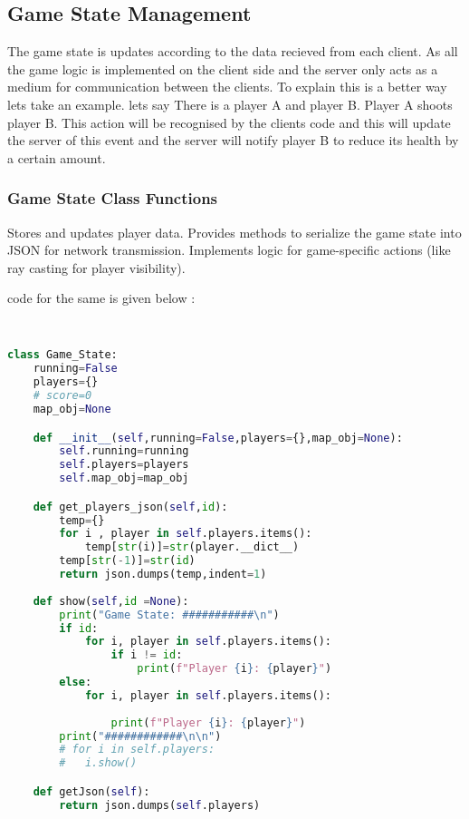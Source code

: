\subsection{Game State Management}
The game state is updates according to the data recieved from each client. As all the game logic is implemented on the client side and the server only acts as a medium for communication between the clients. To explain this is a better way lets take an example. lets say There is a player A and player B. Player A shoots player B. This action will be recognised by the clients code and this will update the server of this event and the server will notify player B to reduce its health by a certain amount. 

\subsubsection{Game State Class Functions}

    Stores and updates player data.
    Provides methods to serialize the game state into JSON for network transmission.
    Implements logic for game-specific actions (like ray casting for player visibility).

    code for the same is given below : 
    \begin{lstlisting}[language=Python]

    
class Game_State:
    running=False
    players={}
    # score=0
    map_obj=None

    def __init__(self,running=False,players={},map_obj=None):
        self.running=running
        self.players=players
        self.map_obj=map_obj

    def get_players_json(self,id):
        temp={}
        for i , player in self.players.items():
            temp[str(i)]=str(player.__dict__)
        temp[str(-1)]=str(id)
        return json.dumps(temp,indent=1)
        
    def show(self,id =None):
        print("Game State: ###########\n")
        if id:
            for i, player in self.players.items():
                if i != id:
                    print(f"Player {i}: {player}") 
        else:
            for i, player in self.players.items():
                
                print(f"Player {i}: {player}")
        print("############\n\n")
        # for i in self.players:
        # 	i.show()

    def getJson(self):
        return json.dumps(self.players)
        \end{lstlisting}
